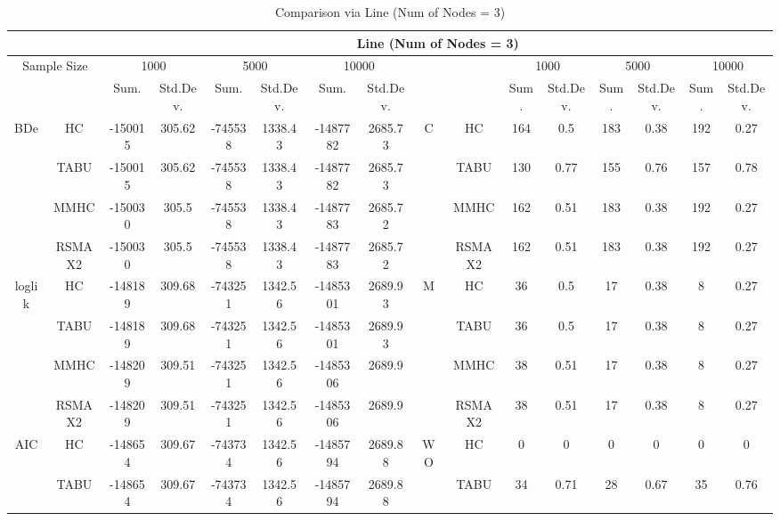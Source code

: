 \begin{table}[h]																									
\centering	\caption{Comparison via Line (Num of Nodes = 3)}	\tiny																						
{\tabcolsep=0.01in																										
\begin{tabular}{cc||cc|cc|cc||cc|cc|cc|cc}																										
\hline																										
&	&	\multicolumn{14}{c}{Line	(Num	of	Nodes	=	3)}\tabularnewline																			
\hline																										
\multicolumn{2}{c||}{Sample	Size}	&	\multicolumn{2}{c|}{1000}	&	\multicolumn{2}{c|}{5000}	&	\multicolumn{2}{c||}{10000}	&	&	&	\multicolumn{2}{c|}{1000}	&	\multicolumn{2}{c|}{5000}	&	\multicolumn{2}{c}{10000}\tabularnewline											
\hline																										
&	&	Sum.	&	Std.Dev.	&	Sum.	&	Std.Dev.	&	Sum.	&	Std.Dev.	&	&	&	Sum.	&	Std.Dev.	&	Sum.	&	Std.Dev.	&	Sum.	&	Std.Dev.\tabularnewline
\hline																										
\hline																										
\multirow{4}{*}{BDe} & HC &	-150015 & 	305.62 & 	-745538 & 	1338.43 & 	-1487782 & 	2685.73 & 	\multirow{4}{*}{C} & HC &	164 & 	0.5 & 	183 & 	0.38 & 	192 & 	0.27\tabularnewline													
& TABU &	-150015 & 	305.62 & 	-745538 & 	1338.43 & 	-1487782 & 	2685.73 & 	& TABU &	130 & 	0.77 & 	155 & 	0.76 & 	157 & 	0.78\tabularnewline													
& MMHC &	-150030 & 	305.5 & 	-745538 & 	1338.43 & 	-1487783 & 	2685.72 & 	& MMHC &	162 & 	0.51 & 	183 & 	0.38 & 	192 & 	0.27\tabularnewline													
& RSMAX2 &	-150030 & 	305.5 & 	-745538 & 	1338.43 & 	-1487783 & 	2685.72 & 	& RSMAX2 &	162 & 	0.51 & 	183 & 	0.38 & 	192 & 	0.27\tabularnewline													
\hline																										
\multirow{4}{*}{loglik} & HC &	-148189 & 	309.68 & 	-743251 & 	1342.56 & 	-1485301 & 	2689.93 & 	\multirow{4}{*}{M} & HC &	36 & 	0.5 & 	17 & 	0.38 & 	8 & 	0.27\tabularnewline													
& TABU &	-148189 & 	309.68 & 	-743251 & 	1342.56 & 	-1485301 & 	2689.93 & 	& TABU &	36 & 	0.5 & 	17 & 	0.38 & 	8 & 	0.27\tabularnewline													
& MMHC &	-148209 & 	309.51 & 	-743251 & 	1342.56 & 	-1485306 & 	2689.9 & 	& MMHC &	38 & 	0.51 & 	17 & 	0.38 & 	8 & 	0.27\tabularnewline													
& RSMAX2 &	-148209 & 	309.51 & 	-743251 & 	1342.56 & 	-1485306 & 	2689.9 & 	& RSMAX2 &	38 & 	0.51 & 	17 & 	0.38 & 	8 & 	0.27\tabularnewline													
\hline																										
\multirow{4}{*}{AIC} & HC &	-148654 & 	309.67 & 	-743734 & 	1342.56 & 	-1485794 & 	2689.88 & 	\multirow{4}{*}{WO} & HC &	0 & 	0 & 	0 & 	0 & 	0 & 	0\tabularnewline													
& TABU &	-148654 & 	309.67 & 	-743734 & 	1342.56 & 	-1485794 & 	2689.88 & 	& TABU &	34 & 	0.71 & 	28 & 	0.67 & 	35 & 	0.76\tabularnewline													

\end{tabular}}
\end{table}
